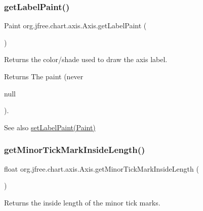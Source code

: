 \subsubsection{\texorpdfstring{get\+Label\+Paint()}{getLabelPaint()}}
{\footnotesize\ttfamily Paint org.\+jfree.\+chart.\+axis.\+Axis.\+get\+Label\+Paint (\begin{DoxyParamCaption}{ }\end{DoxyParamCaption})}

Returns the color/shade used to draw the axis label.

\begin{DoxyReturn}{Returns}
The paint (never
\begin{DoxyCode}
null 
\end{DoxyCode}
 ).
\end{DoxyReturn}
\begin{DoxySeeAlso}{See also}
\mbox{\hyperlink{classorg_1_1jfree_1_1chart_1_1axis_1_1_axis_a68eeb531bf1f73ff8b0d4aa12ed54a1a}{set\+Label\+Paint(\+Paint)}} 
\end{DoxySeeAlso}
\mbox{\label{classorg_1_1jfree_1_1chart_1_1axis_1_1_axis_a99f2ec9bc2d5fb31247c7c6194ed5402}} 
\subsubsection{\texorpdfstring{get\+Minor\+Tick\+Mark\+Inside\+Length()}{getMinorTickMarkInsideLength()}}
{\footnotesize\ttfamily float org.\+jfree.\+chart.\+axis.\+Axis.\+get\+Minor\+Tick\+Mark\+Inside\+Length (\begin{DoxyParamCaption}{ }\end{DoxyParamCaption})}

Returns the inside length of the minor tick marks.

